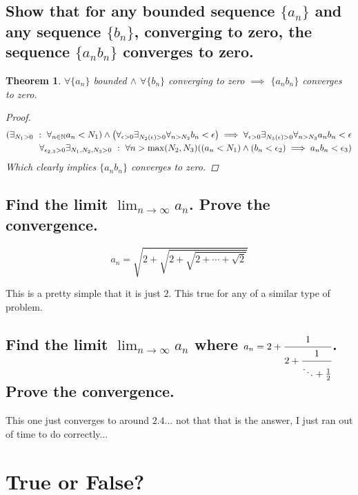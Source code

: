 \documentclass[]{article}
\newcommand{\N}{\mathbb{N}}
\newcommand{\st}{\ : \ }
\newtheorem{theorem}{Theorem}
\begin{document}
\subsection{Show that for any bounded sequence $\{a_n\}$ and any sequence $\{b_n\}$, converging to zero, the sequence $\{a_n b_n\}$ converges to zero.}
\begin{theorem}
    $\forall \{a_n\}$ bounded $\land$ $\forall \{b_n\}$ converging to zero $\implies$ $\{a_n b_n \}$ converges to zero.
    \begin{proof}
        \begin{align*}
            \qty(\exists_{N_1>0} \st \forall_{n\in\N} a_n < N_1) \land \qty(\forall_{\epsilon>0} \exists_{N_2(\epsilon) > 0}  \forall_{n > N_2} b_n < \epsilon) \implies \forall_{\epsilon>0} \exists_{N_3(\epsilon) > 0}  \forall_{n > N_3} a_n b_n < \epsilon\\
            \forall_{\epsilon_{2,3}>0} \exists_{N_1,N_2,N_3 > 0} \st \forall{n > \max(N_2,N_3)} \qty((a_n < N_1) \land (b_n < \epsilon_{2}) \implies a_n b_n < \epsilon_3)
        \end{align*}
        Which clearly implies $\{a_n b_n\}$ converges to zero.
    \end{proof}
\end{theorem}


\subsection{Find the limit $\lim_{n\to\infty} a_n$. Prove the convergence.}
$$a_n = \sqrt{2 + \sqrt{2 + \sqrt{2 + \cdots + \sqrt{2}}}}$$

This is a pretty simple that it is just $2$. This true for any of a similar type of problem.




\subsection{Find the limit $\lim_{n\to\infty} a_n$ where $a_n = 2 + \cfrac{1}{2+\cfrac{1}{\ddots + \frac{1}{2}}}$. Prove the convergence.}

This one just converges to around $2.4$... not that that is the answer, I just ran out of time to do correctly...






\newpage
\section{True or False?}
\end{document}
